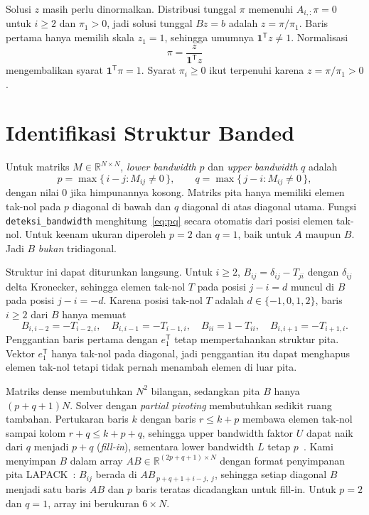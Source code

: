 \documentclass[12pt,a4paper]{article}
\newcommand{\R}{\mathbb{R}}
\newcommand{\T}{\mathsf{T}}
\numberwithin{equation}{section}
\begin{document}
Solusi $z$ masih perlu dinormalkan. Distribusi tunggal $\pi$ memenuhi $A_{i,:}\pi=0$ untuk $i\ge2$ dan $\pi_1>0$,
jadi solusi tunggal $Bz=b$ adalah $z=\pi/\pi_1$. Baris pertama hanya memilih skala $z_1=1$, sehingga umumnya
$\mathbf1^\T z\ne1$. Normalisasi
\begin{equation}\label{eq:normal}
\pi=\frac{z}{\mathbf1^\T z}
\end{equation}
mengembalikan syarat $\mathbf1^\T\pi=1$. Syarat $\pi_i\ge0$ ikut terpenuhi karena $z=\pi/\pi_1>0$.

\section{Identifikasi Struktur Banded}\label{sec:band}
Untuk matriks $M\in\R^{N\times N}$, \emph{lower bandwidth} $p$ dan \emph{upper bandwidth} $q$ adalah
\begin{equation}\label{eq:pq}
p=\max\{\,i-j : M_{ij}\ne0\,\},\qquad q=\max\{\,j-i : M_{ij}\ne0\,\},
\end{equation}
dengan nilai $0$ jika himpunannya kosong. Matriks pita hanya memiliki elemen tak-nol pada $p$ diagonal di bawah dan
$q$ diagonal di atas diagonal utama. Fungsi \texttt{deteksi\_bandwidth} menghitung~\eqref{eq:pq} secara otomatis dari
posisi elemen tak-nol. Untuk keenam ukuran diperoleh $p=2$ dan $q=1$, baik untuk $A$ maupun $B$. Jadi $B$
\emph{bukan} tridiagonal.

Struktur ini dapat diturunkan langsung. Untuk $i\ge2$, $B_{ij}=\delta_{ij}-T_{ji}$ dengan $\delta_{ij}$ delta
Kronecker, sehingga elemen tak-nol $T$ pada posisi $j-i=d$ muncul di $B$ pada posisi $j-i=-d$. Karena posisi tak-nol
$T$ adalah $d\in\{-1,0,1,2\}$, baris $i\ge2$ dari $B$ hanya memuat
\begin{equation}\label{eq:bandB}
B_{i,i-2}=-T_{i-2,i},\quad B_{i,i-1}=-T_{i-1,i},\quad B_{ii}=1-T_{ii},\quad B_{i,i+1}=-T_{i+1,i}.
\end{equation}
Penggantian baris pertama dengan $e_1^\T$ tetap mempertahankan struktur pita. Vektor $e_1^\T$ hanya tak-nol pada
diagonal, jadi penggantian itu dapat menghapus elemen tak-nol tetapi tidak pernah menambah elemen di luar pita.

Matriks dense membutuhkan $N^2$ bilangan, sedangkan pita $B$ hanya $(p+q+1)N$. Solver dengan \emph{partial pivoting}
membutuhkan sedikit ruang tambahan. Pertukaran baris $k$ dengan baris $r\le k+p$ membawa elemen tak-nol sampai kolom
$r+q\le k+p+q$, sehingga upper bandwidth faktor $U$ dapat naik dari $q$ menjadi $p+q$ (\emph{fill-in}), sementara
lower bandwidth $L$ tetap $p$~\cite{golub}. Kami menyimpan $B$ dalam array $AB\in\R^{(2p+q+1)\times N}$ dengan format
penyimpanan pita LAPACK~\cite{lapack}: $B_{ij}$ berada di $AB_{\,p+q+1+i-j,\;j}$, sehingga setiap diagonal $B$ menjadi
satu baris $AB$ dan $p$ baris teratas dicadangkan untuk fill-in. Untuk $p=2$ dan $q=1$, array ini berukuran
$6\times N$.
\end{document}
